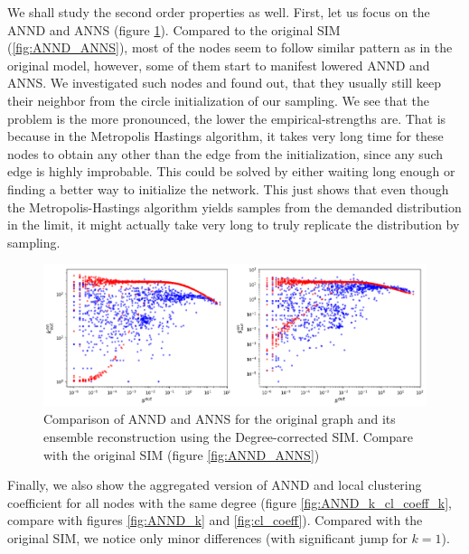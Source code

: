 We shall study the second order properties as well. First, let us focus on the ANND and ANNS (figure \ref*{fig:ANND_ANNS_corrected}). Compared to the original SIM (\ref*{fig:ANND_ANNS}), most of the nodes seem to follow similar pattern as in the original model, however, some of them start to manifest lowered ANND and ANNS. We investigated such nodes and found out, that they usually still keep their neighbor from the circle initialization of our sampling. We see that the problem is the more pronounced, the lower the empirical-strengths are. That is because in the Metropolis Hastings algorithm, it takes very long time for these nodes to obtain any other than the edge from the initialization, since any such edge is highly improbable. This could be solved by either waiting long enough or finding a better way to initialize the network. This just shows that even though the Metropolis-Hastings algorithm yields samples from the demanded distribution in the limit, it might actually take very long to truly replicate the distribution by sampling.

\begin{figure}[!ht]
    \centering
    \includegraphics[scale=0.5]{../img/corrected/annd_anns.png}
    \caption{Comparison of ANND and ANNS for the original graph and its ensemble reconstruction using the Degree-corrected SIM. Compare with the original SIM (figure \ref*{fig:ANND_ANNS})}
    \label{fig:ANND_ANNS_corrected}
\end{figure}

Finally, we also show the aggregated version of ANND and local clustering coefficient for all nodes with the same degree (figure \ref*{fig:ANND_k_cl_coeff_k}, compare with figures \ref*{fig:ANND_k} and \ref*{fig:cl_coeff}). Compared with the original SIM, we notice only minor differences (with significant jump for $k=1$).

